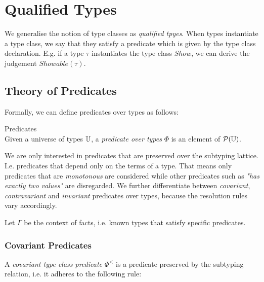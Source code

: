 \chapter{Qualified Types}
\label{ch:qualified-types}

We generalise the notion of type classes as \emph{qualified tpyes}. \cite{jones2003qualified}
When types instantiate a type class, we say that they satisfy a predicate which is given by the type class declaration.
E.g. if a type $\tau$ instantiates the type class $\mathit{Show}$, we can derive the judgement $\mathit{Showable}(\tau)$.

\section{Theory of Predicates}
\label{sec:theory-predicates}

Formally, we can define predicates over types as follows:

\begin{definition} Predicates\\
  Given a universe of types $\mathbb{U}$, a \emph{predicate over types} $\Phi$ is an element of $\mathcal{P}(\mathbb{U})$.
\end{definition}

We are only interested in predicates that are preserved over the subtyping lattice.
I.e. predicates that depend only on the terms of a type.
That means only predicates that are \emph{monotonous} are considered while other predicates such as \emph{"has exactly two values"} are disregarded.
We further differentiate between \emph{covariant}, \emph{contravariant} and \emph{invariant} predicates over types, because the resolution rules vary accordingly.

Let $\Gamma$ be the context of facts, i.e. known types that satisfy specific predicates.

\subsection{Covariant Predicates}
\label{sec:covariant-predicates}



\begin{definition}
  A \emph{covariant type class predicate} $\Phi^<$ is a predicate preserved by the subtyping relation, i.e. it adheres to the following rule:
\end{definition}


